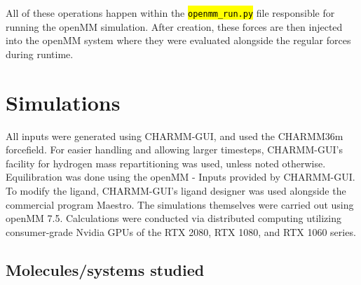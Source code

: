 \documentclass[oneside]{scrreprt}
\newcommand{\code}[1]{\texttt{\hl{#1}}}
\begin{document}
All of these operations happen within the \code{openmm\_run.py} file responsible for running the openMM simulation. After creation, these forces are then injected into the openMM system where they were evaluated alongside the regular forces during runtime.

\section{Simulations}\label{sec:simulations}

All inputs were generated using CHARMM-GUI\cite{Jo2008Aug}, and used the CHARMM36m forcefield\cite{Huang2017Jan}. For easier handling and allowing larger timesteps, CHARMM-GUI's facility for hydrogen mass repartitioning\cite{Gao2021Feb} was used, unless noted otherwise. Equilibration was done using the openMM - Inputs provided by CHARMM-GUI\cite{Brooks2009Jul,Lee2016Jan}. To modify the ligand, CHARMM-GUI's ligand designer\cite{Guterres2021Nov} was used alongside the commercial program Maestro\cite{maestro}. The simulations themselves were carried out using openMM 7.5\cite{Eastman2017Jul}. Calculations were conducted via distributed computing utilizing consumer-grade Nvidia GPUs of the RTX 2080, RTX 1080, and RTX 1060 series.

\subsection{Molecules/systems studied}
\end{document}
